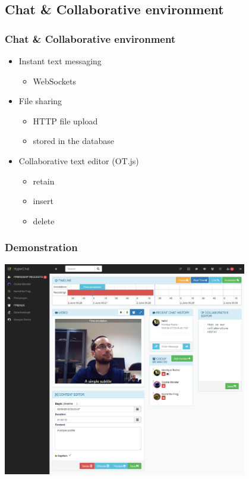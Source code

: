 \documentclass[compress]{beamer}
\begin{document}
\subsection{Chat \& Collaborative environment}

		\begin{frame}[c]
		\frametitle{Chat \& Collaborative environment}


		\begin{itemize}
		\item Instant text messaging
			\begin{itemize}
			\item WebSockets
			\end{itemize}

		\item File sharing
			\begin{itemize}
			\item HTTP file upload
			\item stored in the database
			\end{itemize}
		
		\item Collaborative text editor (OT.js)
			\begin{itemize}
			\item retain
			\item insert
			\item delete
			\end{itemize}
		

		\end{itemize}
		

		\end{frame}

  		\begin{frame}[c]
		\frametitle{Demonstration}
	
		\begin{center}
		\includegraphics[width=0.8\textwidth]{figures/sshot.png}
		\end{center}
		\end{frame}
\end{document}

